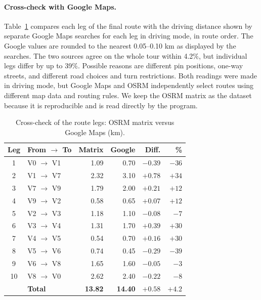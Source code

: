 \paragraph{Cross-check with Google Maps.}
Table~\ref{tab:gmaps} compares each leg of the final route with the driving
distance shown by separate Google Maps searches for each leg in driving mode, in route order.
The Google values are rounded to the nearest 0.05--0.10 km as displayed by
the searches. The two sources
agree on the whole tour within 4.2\%, but individual legs differ by up to
39\%. Possible reasons are different pin positions, one-way streets, and
different road choices and turn restrictions. Both readings were made in driving mode, but Google Maps
and OSRM independently select routes using different map data and routing rules. We keep the OSRM matrix as the dataset because it is
reproducible and is read directly by the program.

\begin{table}[H]
\centering
\caption{Cross-check of the route legs: OSRM matrix versus Google Maps (km).}
\label{tab:gmaps}
\small
\begin{tabular}{c l r r r r}
\toprule
\textbf{Leg} & \textbf{From $\to$ To} & \textbf{Matrix} & \textbf{Google} & \textbf{Diff.} & \textbf{\%} \\
\midrule
1 & V0 $\to$ V1 & 1.09 & 0.70 & $-0.39$ & $-36$ \\
2 & V1 $\to$ V7 & 2.32 & 3.10 & $+0.78$ & $+34$ \\
3 & V7 $\to$ V9 & 1.79 & 2.00 & $+0.21$ & $+12$ \\
4 & V9 $\to$ V2 & 0.58 & 0.65 & $+0.07$ & $+12$ \\
5 & V2 $\to$ V3 & 1.18 & 1.10 & $-0.08$ & $-7$ \\
6 & V3 $\to$ V4 & 1.31 & 1.70 & $+0.39$ & $+30$ \\
7 & V4 $\to$ V5 & 0.54 & 0.70 & $+0.16$ & $+30$ \\
8 & V5 $\to$ V6 & 0.74 & 0.45 & $-0.29$ & $-39$ \\
9 & V6 $\to$ V8 & 1.65 & 1.60 & $-0.05$ & $-3$ \\
10 & V8 $\to$ V0 & 2.62 & 2.40 & $-0.22$ & $-8$ \\
\midrule
 & \textbf{Total} & \textbf{13.82} & \textbf{14.40} & $+0.58$ & $+4.2$ \\
\bottomrule
\end{tabular}
\end{table}
